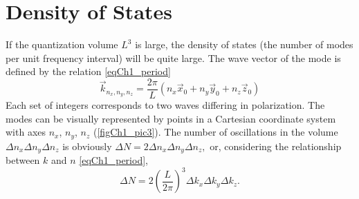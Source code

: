\section{Density of States}
If the quantization volume $L^3$ is large, the density of states (the number of modes per unit frequency interval) will be quite large. The wave vector of the mode is defined by the relation \eqref{eqCh1_period}
\begin{equation}
\vec{k}_{n_x, n_y, n_z} = \frac{2 \pi}{L}\left(n_x \vec{x}_0 + n_y \vec{y}_0 + n_z \vec{z}_0 \right)
\end{equation}
Each set of integers corresponds to two waves differing in polarization. The modes can be visually represented by points in a Cartesian coordinate system with axes $n_x$, $n_y$, $n_z$ (\autoref{figCh1_pic3}). The number of oscillations in the volume  
\(
\Delta n_x \Delta n_y \Delta n_z
\)
is obviously  
\(
\Delta N = 2 \Delta n_x \Delta n_y \Delta n_z,
\)
or, considering the relationship  
between $k$ and $n$ \eqref{eqCh1_period},
\begin{equation}
\Delta N = 2 \left(\frac{L}{2 \pi} \right)^3 \Delta k_x \Delta k_y \Delta k_z.
\label{eqCh1_modenumber}
\end{equation}





